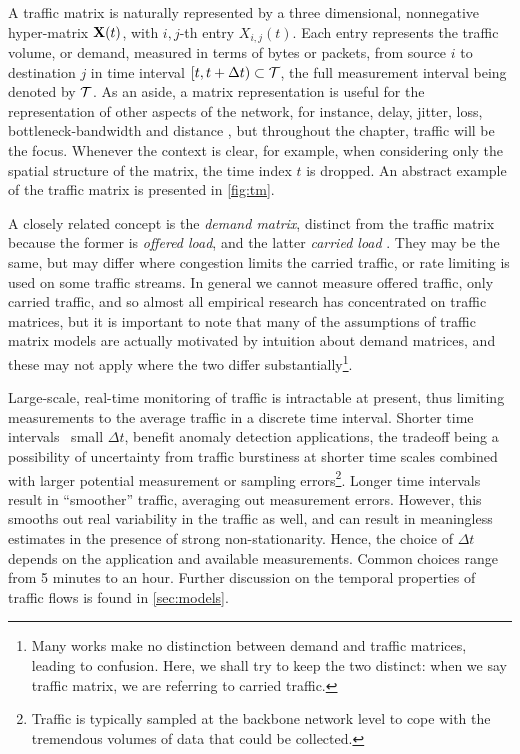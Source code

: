 A traffic matrix is naturally represented by a three dimensional,
nonnegative hyper-matrix $\mathbf{X}(t)$, with $i,j$-th entry $X_{i,j}(t)$.
Each entry represents the traffic volume, or demand, measured in terms
of bytes or packets, from source $i$ to destination $j$ in time
interval $\lbrack t, t+\Delta t) \subset \mathcal{T}$, the full measurement
interval being denoted by $\mathcal{T}$. As an aside, a matrix representation is
useful for the representation of other aspects of the network, for
instance, delay, jitter, loss, bottleneck-bandwidth and distance
\cite{Medina02Taxonomy}, but throughout the chapter, traffic will be
the focus. Whenever the context is clear, for example, when
considering only the spatial structure of the matrix, the time index
$t$ is dropped. An abstract example of the traffic matrix is presented
in \autoref{fig:tm}.

A closely related concept is the {\em demand matrix}, distinct from
the traffic matrix because the former is {\em offered load}, and the
latter {\em carried load} \cite{Feldmann01TMdemand}. 
They may be the same, but may differ where
congestion limits the carried traffic, or rate limiting is used on
some traffic streams. In general we cannot measure offered traffic,
only carried traffic, and so almost all empirical research has
concentrated on traffic matrices, but it is important to note that
many of the assumptions of traffic matrix models are actually
motivated by intuition about demand matrices, and these may not apply
where the two differ substantially\footnote{Many works make no
  distinction between demand and traffic matrices, leading to
  confusion. Here, we shall try to keep the two distinct: when we say
  traffic matrix, we are referring to carried traffic.}.



Large-scale, real-time monitoring of traffic is intractable at
present, thus limiting measurements to the average traffic in a
discrete time interval. Shorter time intervals \ie~small $\Delta t$,
benefit anomaly detection applications, the tradeoff being a
possibility of uncertainty from traffic burstiness at shorter time
scales combined with larger potential measurement or sampling
errors\footnote{Traffic is typically sampled at the backbone network
  level to cope with the tremendous volumes of data that could be
  collected.}. Longer time intervals result in ``smoother'' traffic, 
  averaging out measurement errors. However, this smooths out
real variability in the traffic as well, and can result in meaningless
estimates in the presence of strong non-stationarity. Hence, the
choice of $\Delta t$ depends on the application and available
measurements. Common choices range from 5 minutes to an hour. Further
discussion on the temporal properties of traffic flows is found in
\autoref{sec:models}.

